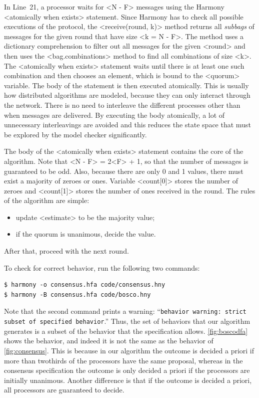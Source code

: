\documentclass{report}
\newenvironment{code}{
\tcolorbox
}{
\endtcolorbox
}
\begin{document}
In Line~21, a processor waits for <{N - F}> messages using
the Harmony <{atomically when exists}> statement.
Since Harmony has to check all possible executions of the protocol, the
<{receive(round, k)}> method returns all \emph{subbags} of messages
for the given round that have size <{k = N - F}>.  The method uses a
dictionary comprehension to filter out all messages for the given <{round}>
and then uses the <{bag.combinations}> method to find all combinations of size <{k}>.
The <{atomically when exists}> statement waits until there is at least one such combination and
then chooses an element, which is bound to the <{quorum}> variable.
The body of the statement is then executed atomically.
This is usually how distributed algorithms are modeled, because they can only interact
through the network.  There is no need to interleave the different processes other
than when messages are delivered.  By executing the body atomically, a lot of
unnecessary interleavings are avoided and this reduces the state space that must
be explored by the model checker significantly.

The body of the <{atomically when exists}> statement contains the core of the algorithm.
Note that <{N - F}> = 2<{F}> + 1, so that the number of
messages is guaranteed to be odd.  Also, because there are only 0 and 1 values, there
must exist a majority of zeroes or ones.  Variable <{count[0]}> stores the number
of zeroes and <{count[1]}> stores the number of ones received in the round.
The rules of the algorithm are simple:
\begin{itemize}
\item update <{estimate}> to be the majority value;
\item if the quorum is unanimous, decide the value.
\end{itemize}
After that, proceed with the next round.

To check for correct behavior, run the following two commands:
\begin{code}
\begin{verbatim}
$ harmony -o consensus.hfa code/consensus.hny
$ harmony -B consensus.hfa code/bosco.hny
\end{verbatim}
\end{code}

Note that the second command prints a warning:
``\texttt{behavior warning: strict subset of specified behavior}.''
Thus, the set of behaviors that our algorithm generates is a subset
of the behavior that the specification allows.
\autoref{fig:boscodfa} shows the behavior, and indeed it is not the
same as the behavior of \autoref{fig:consensus}.
This is because in our algorithm the outcome is decided a priori if more than
twothirds of the processors have the same proposal, whereas in the
consensus specification the outcome is only decided a priori if the
processors are initially unanimous.  Another difference is that if the
outcome is decided a priori, all processors are guaranteed to decide.
\end{document}
